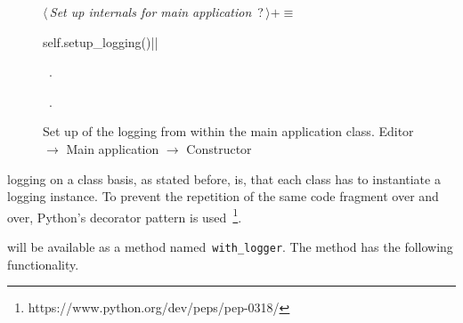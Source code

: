 \documentclass[%
    a4paper,    %
    justified,  %
    nobib,      %
    openany     %
]{tufte-book}
\begin{document}
\begin{figure}
\begin{flushleft} \small
\begin{minipage}{\linewidth}\label{scrap56}\raggedright\small
{} $\langle\,${\itshape Set up internals for main application}\nobreak\ {\footnotesize {?}}$\,\rangle+\equiv$
\vspace{-1ex}
\begin{pythoncode}

self.setup_logging()|\NWsep|
\end{pythoncode}
\vspace{1.5ex}
\footnotesize
\begin{list}{}{\setlength{\itemsep}{-\parsep}\setlength{\itemindent}{-\leftmargin}}
\item \NWtxtMacroDefBy\ .
\item \NWtxtMacroRefIn\ .

\item{}
\end{list}
\end{minipage}\vspace{4ex}
\end{flushleft}
\caption{Set up of the logging from within the main application class.
  \newline{}\newline{}Editor $\rightarrow$ Main application
  $\rightarrow$ Constructor}
\label{logging:lst:main-application:constructor:setup-logging}
\end{figure}

 logging on a class basis, as stated
before, is, that each class has to instantiate a logging instance. To prevent
the repetition of the same code fragment over and over, Python's decorator
pattern is used~\footnote{https://www.python.org/dev/peps/pep-0318/}.

 will be available as a method
named~\verb=with_logger=. The method has the following functionality.
\end{document}
